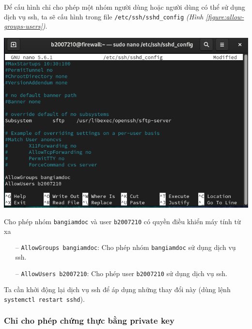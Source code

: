 \documentclass[a4paper, 11pt]{article}
\begin{document}
Để cấu hình chỉ cho phép một nhóm người dùng hoặc người dùng có thể sử dụng dịch vụ ssh, ta sẽ cấu hình trong file \texttt{/etc/ssh/sshd\_config} \textit{(Hình \ref{figure:allow-groups-users})}. \\
\begin{minipage}
    {\linewidth}
    \captionsetup{type=figure}
    \centering
    \includegraphics[width=\linewidth]{images/allow-groups-users.png}
    \caption{Cho phép nhóm \texttt{bangiamdoc} và user \texttt{b2007210} có quyền điều khiển máy tính từ xa}
    \label{figure:allow-groups-users}
\end{minipage}
\begin{itemize}
    \item[--] \texttt{AllowGroups bangiamdoc}: Cho phép nhóm \texttt{bangiamdoc} sử dụng dịch vụ ssh.
    \item[--] \texttt{AllowUsers b2007210}: Cho phép user \texttt{b2007210} sử dụng dịch vụ ssh.
\end{itemize}

Ta cần khởi động lại dịch vụ ssh để áp dụng những thay đổi này (dùng lệnh \texttt{systemctl restart sshd}).

\subsubsection{Chỉ cho phép chứng thực bằng private key}
\end{document}
